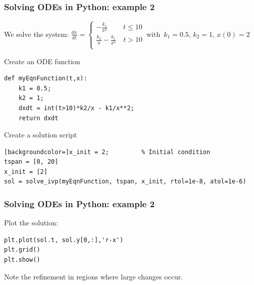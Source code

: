 \begin{frame}[fragile]
  \frametitle{Solving ODEs in Python: example 2}
  We solve the system: $\displaystyle \frac{dx}{dt} = \begin{cases}
    -\frac{k_1}{x^2} \quad\ \quad t \leq 10\\
    \frac{k_2}{x} - \frac{k_1}{x^2} \quad  t > 10\\
 \end{cases}\, \text{with }\, k_1 = 0.5,\, k_2 = 1,\, x(0) = 2$
 \vspace*{1ex}
  \begin{block}{Create an ODE function}
    \begin{lstlisting}
def myEqnFunction(t,x):
    k1 = 0.5;
    k2 = 1;
    dxdt = int(t>10)*k2/x - k1/x**2;
    return dxdt
    \end{lstlisting}
  \end{block}
  \pause
  \begin{block}{Create a solution script}
    \begin{lstlisting}[backgroundcolor=]x_init = 2;         % Initial condition
tspan = [0, 20]
x_init = [2]
sol = solve_ivp(myEqnFunction, tspan, x_init, rtol=1e-8, atol=1e-6)
    \end{lstlisting}
  \end{block}
\vfill
\end{frame}

{\nologo
\begin{frame}[fragile]
  \frametitle{Solving ODEs in Python: example 2}
  Plot the solution:
  \begin{lstlisting}
plt.plot(sol.t, sol.y[0,:],'r-x')
plt.grid()
plt.show()
  \end{lstlisting}
  \pause
  \begin{center}
  \end{center}
  Note the refinement in regions where large changes occur.
\end{frame}
}


